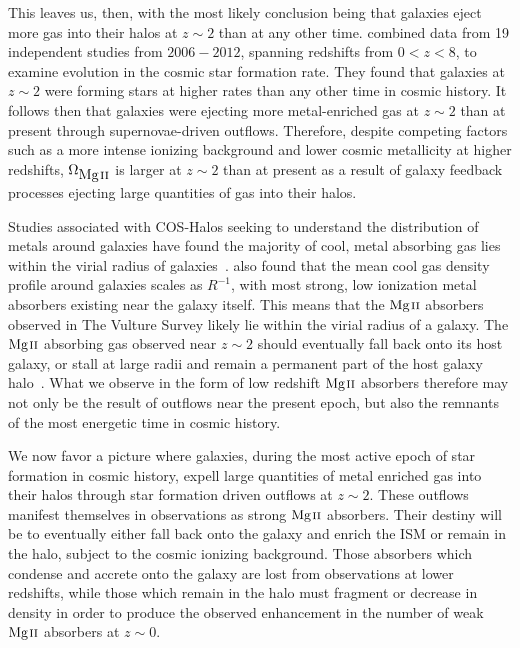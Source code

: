 \documentclass[iop,apj,numberedappendix,appendixfloats,twocolappendix]{emulateapj}
\begin{document}
This leaves us, then, with the most likely conclusion being that galaxies eject more gas into their halos at $z \sim 2$ than at any other time. \cite{Behroozi2013sfr} combined data from 19 independent studies from $2006-2012$, spanning redshifts from $0 < z < 8$, to examine evolution in the cosmic star formation rate. They found that galaxies at $z \sim 2$ were forming stars at higher rates than any other time in cosmic history. It follows then that galaxies were ejecting more metal-enriched gas at $z \sim 2$ than at present through supernovae-driven outflows. Therefore, despite competing factors such as a more intense ionizing background and lower cosmic metallicity at higher redshifts, $\Omega_{\hbox{{\rm Mg}\kern 0.1em{\sc ii}}}$ is larger at $z \sim 2$ than at present as a result of galaxy feedback processes ejecting large quantities of gas into their halos. 

Studies associated with COS-Halos seeking to understand the distribution of metals around galaxies have found the majority of cool, metal absorbing gas lies within the virial radius of galaxies~\citep{Peeples2014}. \cite{Stern2016} also found that the mean cool gas density profile around galaxies scales as $R^{-1}$, with most strong, low ionization metal absorbers existing near the galaxy itself. This means that the ${\hbox{{\rm Mg}\kern 0.1em{\sc ii}}}$ absorbers observed in The Vulture Survey likely lie within the virial radius of a galaxy. The ${\hbox{{\rm Mg}\kern 0.1em{\sc ii}}}$ absorbing gas observed near $z \sim 2$ should eventually fall back onto its host galaxy, or stall at large radii and remain a permanent part of the host galaxy halo~\citep{Ford2014}. What we observe in the form of low redshift ${\hbox{{\rm Mg}\kern 0.1em{\sc ii}}}$ absorbers therefore may not only be the result of outflows near the present epoch, but also the remnants of the most energetic time in cosmic history. 

We now favor a picture where galaxies, during the most active epoch of star formation in cosmic history, expell large quantities of metal enriched gas into their halos through star formation driven outflows at $z \sim 2$. These outflows manifest themselves in observations as strong ${\hbox{{\rm Mg}\kern 0.1em{\sc ii}}}$ absorbers. Their destiny will be to eventually either fall back onto the galaxy and enrich the ISM or remain in the halo, subject to the cosmic ionizing background. Those absorbers which condense and accrete onto the galaxy are lost from observations at lower redshifts, while those which remain in the halo must fragment or decrease in density in order to produce the observed enhancement in the number of weak ${\hbox{{\rm Mg}\kern 0.1em{\sc ii}}}$ absorbers at $z \sim 0$. 
\end{document}
